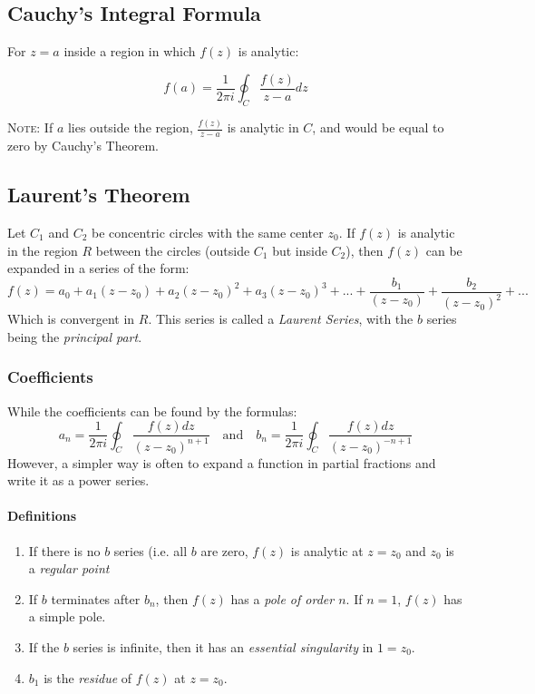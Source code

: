 \documentclass[12pt]{article}
\begin{document}
\subsection{Cauchy's Integral Formula}

For $z=a$ inside a region in which $f(z)$ is analytic:

\[ f(a) = \frac{1}{2\pi i} \oint_C \frac{f(z)}{z-a} dz\]

\textsc{Note}: If $a$ lies outside the region, $\frac{f(z)}{z-a}$ is analytic in $C$, and would be equal to zero by Cauchy's Theorem.

\subsection{Laurent's Theorem}

Let $C_1$ and $C_2$ be concentric circles with the same center $z_0$. If $f(z)$ is analytic in the region $R$ between the circles (outside $C_1$ but inside $C_2$), then $f(z)$ can be expanded in a series of the form:
\[ f(z) = a_0 + a_1(z-z_0) + a_2(z-z_0)^2+a_3(z-z_0)^3 +...+\frac{b_1}{(z-z_0)}+\frac{b_2}{(z-z_0)^2}+...\] 
Which is convergent in $R$. This series is called a \textit{Laurent Series}, with the $b$ series being the \textit{principal part}.

\subsubsection{Coefficients}
While the coefficients can be found by the formulas:
\[
a_n = \frac{1}{2\pi i} \oint_C \frac{f(z)dz}{(z-z_0)^{n+1}} \quad\text{and}\quad b_n = \frac{1}{2\pi i} \oint_C \frac{f(z)dz}{(z-z_0)^{-n+1}}
\]
However, a simpler way is often to expand a function in partial fractions and write it as a power series. 

\paragraph{Definitions}
\begin{enumerate}
    \item If there is no $b$ series (i.e. all $b$ are zero, $f(z)$ is analytic at $z=z_0$ and $z_0$ is a \textit{regular point}
    \item If $b$ terminates after $b_n$, then $f(z)$ has a \textit{pole of order $n$}. If $n=1$, $f(z)$ has a simple pole.
    \item If the $b$ series is infinite, then it has an \textit{essential singularity} in $1=z_0$.
    \item $b_1$ is the \textit{residue} of $f(z)$ at $z=z_0$.
\end{enumerate}
\end{document}
